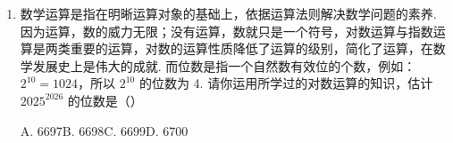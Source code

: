 \documentclass[a4paper,11pt]{article}
\begin{document}
\begin{enumerate}
\ifanswer
\solbegin
{}
\solend
\fi

\item 数学运算是指在明晰运算对象的基础上，依据运算法则解决数学问题的素养. 因为运算，数的威力无限；没有运算，数就只是一个符号，对数运算与指数运算是两类重要的运算，对数的运算性质降低了运算的级别，简化了运算，在数学发展史上是伟大的成就. 而位数是指一个自然数有效位的个数，例如：$2^{10}=1024$，所以 $2^{10}$ 的位数为 4. 请你运用所学过的对数运算的知识，估计 $2025^{2026}$ 的位数是\mbox{（\quad）}

\keepwithprev
A. 6697\qquad B. 6698\qquad C. 6699\qquad D. 6700

\ifanswer
\solbegin
{}
\solend
\fi

\end{enumerate}

\end{document}
